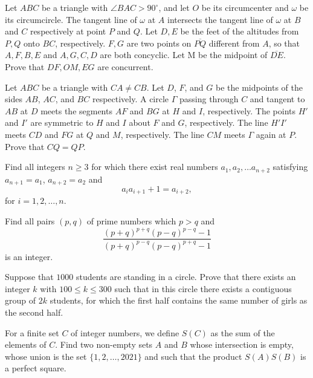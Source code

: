 \documentclass[11pt]{scrartcl}
\begin{document}
\begin{problem}[571373387028298]
Let $ABC$ be a triangle with $\angle BAC > 90 ^{\circ}$, and let $O$ be its circumcenter and $\omega$ be its circumcircle. The tangent line of $\omega$ at $A$ intersects the tangent line of $\omega$ at $B$ and $C$ respectively at point $P$ and $Q$. Let $D,E$ be the feet of the altitudes from $P,Q$ onto $BC$, respectively. $F,G$ are two points on $\overline{PQ}$ different from $A$, so that $A,F,B,E$ and $A,G,C,D$ are both concyclic. Let M be the midpoint of $\overline{DE}$. Prove that $DF,OM,EG$ are concurrent.
\end{problem}
\begin{problem}[572967976964328]
	Let $ABC$ be a triangle with $CA \neq CB$. Let $D$, $F$, and $G$ be the midpoints of the sides $AB$, $AC$, and $BC$ respectively. A circle $\Gamma$ passing through $C$ and tangent to $AB$ at $D$ meets the segments $AF$ and $BG$ at $H$ and $I$, respectively. The points $H'$ and $I'$ are symmetric to $H$ and $I$ about $F$ and $G$, respectively. The line $H'I'$ meets $CD$ and $FG$ at $Q$ and $M$, respectively. The line $CM$ meets $\Gamma$ again at $P$. Prove that $CQ = QP$.
\end{problem}
\begin{problem}[574223786384294]
Find all integers $n \geq 3$ for which there exist real numbers $a_1, a_2, \dots a_{n + 2}$ satisfying $a_{n + 1} = a_1$, $a_{n + 2} = a_2$ and
$$a_ia_{i + 1} + 1 = a_{i + 2},$$for $i = 1, 2, \dots, n$.
\end{problem}
\begin{problem}[574687232505662]
	Find all pairs $(p,q)$ of prime numbers which $p>q$ and
$$\frac{(p+q)^{p+q}(p-q)^{p-q}-1}{(p+q)^{p-q}(p-q)^{p+q}-1}$$is an integer.
\end{problem}
\begin{problem}[575901379082524]
Suppose that $1000$ students are standing in a circle. Prove that there exists an integer $k$ with $100 \leq k \leq 300$ such that in this circle there exists a contiguous group of $2k$ students, for which the first half contains the same number of girls as the second half.
\end{problem}
\begin{problem}[576014113251153]
For a finite set $C$ of integer numbers, we define $S(C)$ as the sum of the elements of $C$. Find two non-empty sets $A$ and $B$ whose intersection is empty, whose union is the set $\{1,2,\ldots, 2021\}$ and such that the product $S(A)S(B)$ is a perfect square.
\end{problem}
\end{document}
